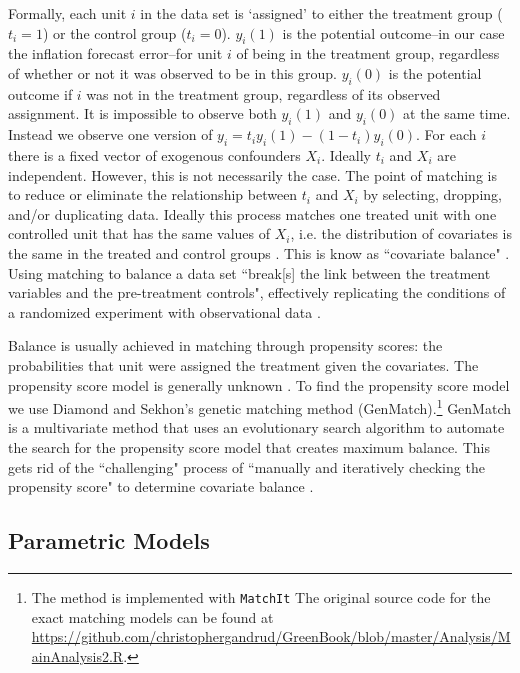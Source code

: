 \documentclass[a4paper]{article}\usepackage{graphicx, color}
\begin{document}
Formally, each unit $i$ in the data set is `assigned' to either the treatment group ($t_{i} = 1$) or the control group ($t_{i} = 0$). $y_{i}(1)$ is the potential outcome--in our case the inflation forecast error--for unit $i$ of being in the treatment group, regardless of whether or not it was observed to be in this group. $y_{i}(0)$ is the potential outcome if $i$ was not in the treatment group, regardless of its observed assignment. It is impossible to observe both $y_{i}(1)$ and $y_{i}(0)$ at the same time. Instead we observe one version of $y_{i}=t_{i}y_{i}(1)-(1-t_{i})y_i(0)$. For each $i$ there is a fixed vector of exogenous confounders $X_{i}$. Ideally $t_{i}$ and $X_{i}$ are independent. However, this is not necessarily the case. The point of matching is to reduce or eliminate the relationship between $t_{i}$  and $X_{i}$ by selecting, dropping, and/or duplicating data. Ideally this process matches one treated unit with one controlled unit that has the same values of $X_{i}$, i.e. the distribution of covariates is the same in the treated and control groups \citep{matchit2011}. This is know as ``covariate balance" \cite[1]{Diamond2012}. Using matching to balance a data set ``break[s] the link between the treatment variables and the pre-treatment controls", effectively replicating the conditions of a randomized experiment with observational data \cite[][2--3]{matchit2011}. 

Balance is usually achieved in matching through propensity scores: the probabilities that unit were assigned the treatment given the covariates. The propensity score model is generally unknown \citep{Drake1993}. To find the propensity score model we use Diamond and Sekhon's \citeyearpar{Diamond2012} genetic matching method (GenMatch).\footnote{The method is implemented with {\tt{MatchIt}} The original source code for the exact matching models can be found at {\url{https://github.com/christophergandrud/GreenBook/blob/master/Analysis/MainAnalysis2.R}}.} GenMatch is a multivariate method that uses an evolutionary search algorithm to automate the search for the propensity score model that creates maximum balance. This gets rid of the ``challenging" process of ``manually and iteratively checking the propensity score" to determine covariate balance \citep[][2]{Diamond2012}.


\subsection{Parametric Models}
\end{document}
